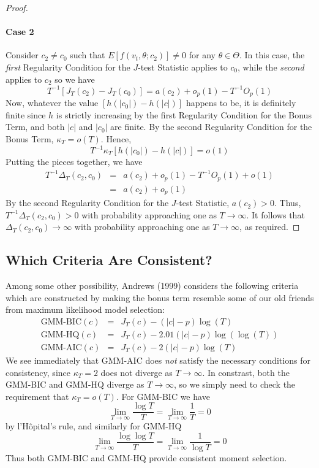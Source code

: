 \documentclass[12pt]{article}
\theoremstyle{definition}
\begin{document}
\begin{proof}
\paragraph{Case 2} Consider $c_2 \neq c_0$ such that $E[f(v_t, \theta; c_2)]\neq 0$ for any $\theta \in \Theta$. In this case, the \emph{first} Regularity Condition for the $J$-test Statistic applies to $c_0$, while the \emph{second} applies to $c_2$ so we have
	$$T^{-1}\left[J_T(c_2) - J_T(c_0) \right] = a(c_2) + o_p(1) - T^{-1} O_p(1)$$
Now, whatever the value $\left[h(|c_0|) - h(|c|) \right]$ happens to be, it is definitely finite since $h$ is strictly increasing by the first Regularity Condition for the Bonus Term, and both $|c|$ and $|c_0|$ are finite. By the second Regularity Condition for the Bonus Term, $\kappa_T = o(T)$. Hence,
	$$T^{-1} \kappa_T\left[h(|c_0|) - h(|c|) \right] = o(1)$$
Putting the pieces together, we have
\begin{eqnarray*}
	T^{-1} \Delta_T(c_2, c_0) &=& a(c_2) + o_p(1) - T^{-1}O_p(1) + o(1)\\
	&=& a(c_2) + o_p(1)
\end{eqnarray*}
By the second Regularity Condition for the $J$-test Statistic, $a(c_2) >0$. Thus, $T^{-1}\Delta_T(c_2,c_0) >0$ with probability approaching one as $T\rightarrow \infty$. It follows that $\Delta_T(c_2,c_0)  \rightarrow \infty$ with probability approaching one as $T\rightarrow \infty$, as required.
\end{proof}

\subsection{Which Criteria Are Consistent?}
Among some other possibility, Andrews (1999) considers the following criteria which are constructed by making the bonus term resemble some of our old friends from maximum likelihood model selection:
\begin{eqnarray*}
	\mbox{GMM-BIC}(c) &=& J_T(c) - \left(|c| - p\right)\log(T)\\
	\mbox{GMM-HQ}(c) &=& J_T(c) - 2.01\left(|c| - p\right)\log(\log(T))\\
	\mbox{GMM-AIC}(c) &=& J_T(c) - 2\left(|c| - p\right)\log(T)
\end{eqnarray*}
We see immediately that GMM-AIC does \emph{not} satisfy the necessary conditions for consistency, since $\kappa_T = 2$ does not diverge as $T\rightarrow \infty$. In constrast, both the GMM-BIC and GMM-HQ diverge as $T\rightarrow \infty$, so we simply need to check the requirement that $\kappa_T = o(T)$. For GMM-BIC we have 
	$$\lim_{T \rightarrow \infty} \frac{\log T}{T} = \lim_{T \rightarrow \infty} \frac{1}{T} = 0$$
by l'H\^{o}pital's rule, and similarly for GMM-HQ
	$$\lim_{T \rightarrow \infty} \frac{\log \log T}{T} = \lim_{T \rightarrow \infty} \frac{1}{\log T} = 0$$
Thus both GMM-BIC and GMM-HQ provide consistent moment selection.
 
\end{document}
